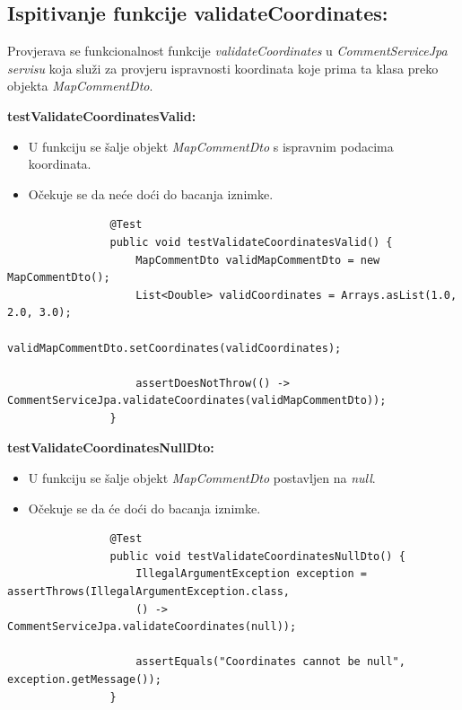 			\subsection{Ispitivanje funkcije validateCoordinates:}
			Provjerava se funkcionalnost funkcije \textit{validateCoordinates} u \textit{CommentServiceJpa servisu} koja služi za provjeru ispravnosti koordinata koje prima ta klasa preko objekta \textit{MapCommentDto}.
			
			\textbf{testValidateCoordinatesValid:}
			\begin{itemize}
				\item U funkciju se šalje objekt \textit{MapCommentDto} s ispravnim podacima koordinata.
				\item Očekuje se da neće doći do bacanja iznimke.
			\end{itemize}
			\begin{lstlisting}
				@Test
				public void testValidateCoordinatesValid() {
					MapCommentDto validMapCommentDto = new MapCommentDto();
					List<Double> validCoordinates = Arrays.asList(1.0, 2.0, 3.0);
					validMapCommentDto.setCoordinates(validCoordinates);
					
					assertDoesNotThrow(() -> CommentServiceJpa.validateCoordinates(validMapCommentDto));
				}
			\end{lstlisting}
			
			\textbf{testValidateCoordinatesNullDto:}
			\begin{itemize}
				\item U funkciju se šalje objekt \textit{MapCommentDto} postavljen na \textit{null}.
				\item Očekuje se da će doći do bacanja iznimke.
			\end{itemize}
			\begin{lstlisting}
				@Test
				public void testValidateCoordinatesNullDto() {
					IllegalArgumentException exception = assertThrows(IllegalArgumentException.class,
					() -> CommentServiceJpa.validateCoordinates(null));
					
					assertEquals("Coordinates cannot be null", exception.getMessage());
				}
			\end{lstlisting}
			
